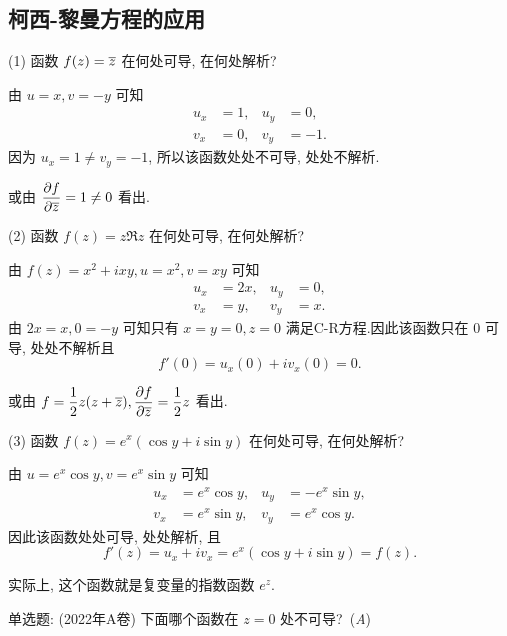 \documentclass[nocolor,theme=doremi,lang=cn,11pt,chinese,twoside,openright,usesamecnt]{elegantbook}
\newcommand\enumnum[1]{{\mdseries\upshape\textcolor[rgb]{.2,.2,.7}{(#1)}}}
\newcommand\fillbrace[1]{{(\nolinebreak\hspace{0.5em minus 0.5em}\emph{#1}\hspace{0.5em minus 0.5em}\nolinebreak)}}
\begin{document}
\subsection{柯西-黎曼方程的应用}

\begin{example}
	\enumnum1 函数 $f(z)=\overline z$ 在何处可导, 在何处解析?
\end{example}

\begin{solution}
	由 $u=x,v=-y$ 可知
	\begin{align*}
	u_x&=1,&u_y&=0,\\
	v_x&=0,&v_y&=-1.
	\end{align*}
	{因为 $u_x=1\neq v_y=-1$, 所以该函数处处不可导, 处处不解析.}
\end{solution}
或由 $\dfrac{\partial f}{\partial \overline z}=1\neq0$ 看出.

\begin{example}[续]
	\enumnum2 函数 $f(z)=z\Re z$ 在何处可导, 在何处解析?
\end{example}

\begin{solution}
	由 $f(z)=x^2+ixy,u=x^2,v=xy$
	{可知
	\begin{align*}
		u_x&=2x,&u_y&=0,\\
		v_x&=y, &v_y&=x.
	\end{align*}由 $2x=x,0=-y$ 可知只有 $x=y=0,z=0$ 满足C-R方程.因此该函数只在 $0$ 可导, 处处不解析且
		\[f'(0)=u_x(0)+iv_x(0)=0.\]}
\end{solution}
或由 $f=\dfrac12 z(z+\overline z), \dfrac{\partial f}{\partial \overline z}=\dfrac12 z$ 看出.

\begin{example}[续]
	\enumnum3 函数 $f(z)=e^x(\cos y+i\sin y)$ 在何处可导, 在何处解析?
\end{example}

\begin{solution}
	由 $u=e^x\cos y,v=e^x\sin y$
	{可知
	\begin{align*}
	u_x&=e^x\cos y,&u_y&=-e^x\sin y,\\
	v_x&=e^x\sin y,&v_y&=e^x\cos y.
	\end{align*}因此该函数处处可导, 处处解析, 且
	\[f'(z)=u_x+iv_x=e^x(\cos y+i\sin y)=f(z).\]}
\end{solution}

实际上, 这个函数就是复变量的指数函数 $e^z$.

\begin{exercise}
	单选题: (2022年A卷) 下面哪个函数在 $z=0$ 处不可导?~\fillbrace{{A}}
\end{exercise}
\end{document}
